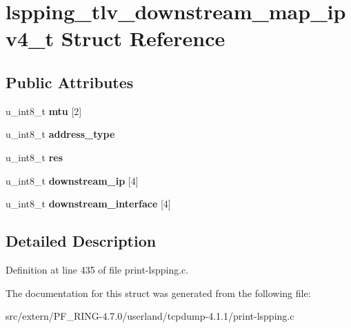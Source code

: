 \hypertarget{structlspping__tlv__downstream__map__ipv4__t}{
\section{lspping\_\-tlv\_\-downstream\_\-map\_\-ipv4\_\-t Struct Reference}
\label{structlspping__tlv__downstream__map__ipv4__t}
}
\subsection*{Public Attributes}
\begin{DoxyCompactItemize}
\item 
\hypertarget{structlspping__tlv__downstream__map__ipv4__t_a7350c973dcacf256e48de5e620195d6d}{
u\_\-int8\_\-t {\bfseries mtu} \mbox{[}2\mbox{]}}
\label{structlspping__tlv__downstream__map__ipv4__t_a7350c973dcacf256e48de5e620195d6d}

\item 
\hypertarget{structlspping__tlv__downstream__map__ipv4__t_abb5d4501a2f458944cbaedb4cabb6d32}{
u\_\-int8\_\-t {\bfseries address\_\-type}}
\label{structlspping__tlv__downstream__map__ipv4__t_abb5d4501a2f458944cbaedb4cabb6d32}

\item 
\hypertarget{structlspping__tlv__downstream__map__ipv4__t_a3c427c8ff90c4ac72b3bcda81f4b0fc9}{
u\_\-int8\_\-t {\bfseries res}}
\label{structlspping__tlv__downstream__map__ipv4__t_a3c427c8ff90c4ac72b3bcda81f4b0fc9}

\item 
\hypertarget{structlspping__tlv__downstream__map__ipv4__t_a553fe514350bbe1ab9dac7618b0e1538}{
u\_\-int8\_\-t {\bfseries downstream\_\-ip} \mbox{[}4\mbox{]}}
\label{structlspping__tlv__downstream__map__ipv4__t_a553fe514350bbe1ab9dac7618b0e1538}

\item 
\hypertarget{structlspping__tlv__downstream__map__ipv4__t_a619d15336523a48b807601e4a8752a08}{
u\_\-int8\_\-t {\bfseries downstream\_\-interface} \mbox{[}4\mbox{]}}
\label{structlspping__tlv__downstream__map__ipv4__t_a619d15336523a48b807601e4a8752a08}

\end{DoxyCompactItemize}


\subsection{Detailed Description}


Definition at line 435 of file print-\/lspping.c.



The documentation for this struct was generated from the following file:\begin{DoxyCompactItemize}
\item 
src/extern/PF\_\-RING-\/4.7.0/userland/tcpdump-\/4.1.1/print-\/lspping.c\end{DoxyCompactItemize}
